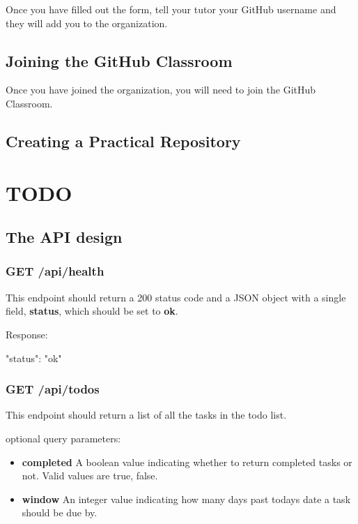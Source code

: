 \documentclass{csse4400}
\begin{document}
Once you have filled out the form,
tell your tutor your GitHub username and they will add you to the organization.

\subsection{Joining the GitHub Classroom}
Once you have joined the organization,
you will need to join the GitHub Classroom.


\subsection{Creating a Practical Repository}

\section{TODO}

\subsection{The API design}

\subsubsection{GET /api/health}
This endpoint should return a 200 status code and a JSON object with a single field, \textbf{status}, which should be set to \textbf{ok}.

Response:
\begin{code}[language=json]{}
{
  "status": "ok"
}
\end{code}

\subsubsection{GET /api/todos}
This endpoint should return a list of all the tasks in the todo list.

optional query parameters:
\begin{itemize}
  \item \textbf{completed} A boolean value indicating whether to return completed tasks or not. Valid values are true, false.
  \item\textbf{window} An integer value indicating how many days past todays date a task should be due by.
\end{itemize}
\end{document}
